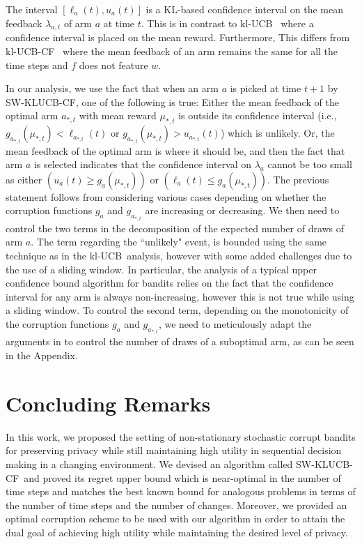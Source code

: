 \documentclass[letterpaper]{article} %
\newcommand{\KLUCBCF}{$\mathrm{kl}$-\textsc{UCB-CF}}
\newcommand{\SWKLUCBCF}{\textsc{SW-KLUCB-CF}}
\newcommand{\KLUCB}{$\mathrm{kl}$-\textsc{UCB}}
\newcommand{\optArm}[1]{a_{*, #1}}
\newcommand{\optMean}[1]{\mu_{*, #1}}
\newcommand{\meanFeedback}[2]{\lambda_{#1, #2}}
\newcommand{\windowsize}{w}
\begin{document}
\vspace{-2.88mm}
The interval $[\ell_a(t), u_a(t)]$ is a KL-based confidence interval on the mean feedback $\meanFeedback{a}{t}$ of arm $a$ at time $t$.
This is in contrast to \KLUCB\ \citep{KLUCBJournal} where a confidence interval is placed on the mean reward. Furthermore,
This differs from \KLUCBCF \ \cite{pmlr-v83-gajane18a} where the mean feedback of an arm remains the same for all the time steps and $f$ does not feature $\windowsize$.

In our analysis, we use the fact that when an arm $a$ is picked at time $t+1$ by \SWKLUCBCF, one of the following is true:
Either the mean feedback of the optimal arm $\optArm{t}$ with mean reward $\optMean{t}$ is outside its confidence interval (i.e., $g_{\optArm{t}}(\optMean{t}) < \ell_{\optArm{t}}(t)$ or $g_{\optArm{t}}(\optMean{t}) > u_{\optArm{t}}(t)$) which is unlikely. Or,
the mean feedback of the optimal arm is where it should be, and then the fact that arm $a$ is selected indicates that the confidence interval on $\lambda_a$ cannot be too small as either $(u_a(t) \geq g_a(\optMean{t}))$ or $(\ell_a(t) \leq g_a(\optMean{t}))$.
The previous statement follows from considering various cases depending on whether the corruption functions $g_a$ and $g_{\optArm{t}}$ are increasing or decreasing.
We then need to control the two terms in the decomposition of the expected number of draws of arm $a$. The term regarding the ``unlikely" event, is bounded using the same technique as in the \KLUCB \ analysis, however with some added challenges due to the use of a sliding window. In particular, the analysis of a typical upper confidence bound algorithm for bandits relies on the fact that the confidence interval for any arm is always non-increasing, however this is not true while using a sliding window. To control the second term, depending on the monotonicity of the corruption functions $g_a$ and $g_{\optArm{t}}$, we need to meticulously adapt the arguments in \citet{KLUCBJournal} to control the number of draws of a suboptimal arm, as can be seen in the Appendix.

\vspace{-2.51mm}
\section{Concluding Remarks}
In this work, we proposed the setting of non-stationary stochastic corrupt bandits for preserving privacy while still maintaining high utility in sequential decision making in a changing environment. We devised an algorithm called \SWKLUCBCF \ and proved its regret upper bound which is near-optimal in the number of time steps and matches the best known bound for analogous problems in terms of the number of time steps and the number of changes. Moreover, we provided an optimal corruption scheme to be used with our algorithm in order to attain the dual goal of achieving high utility while maintaining the desired level of privacy.
\end{document}
